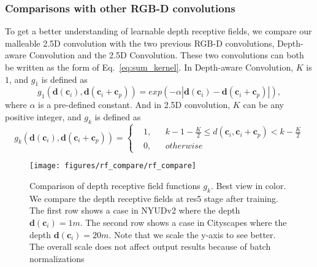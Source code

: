 \documentclass[runningheads]{llncs}
\begin{document}
\subsubsection{Comparisons with other RGB-D convolutions}
To get a better understanding of learnable depth receptive fields, we compare our malleable 2.5D convolution with the two previous RGB-D convolutions, Depth-aware Convolution and the 2.5D Convolution.
These two convolutions can both be written as the form of Eq.~\ref{eq:sum_kernel}.
In Depth-aware Convolution, $K$ is $1$, and $g_1$ is defined as
\begin{equation}
  g_1(\mathbf{d}(\mathbf{c}_i), \mathbf{d}(\mathbf{c}_i+\mathbf{c}_p))
  =
  exp(-\alpha|\mathbf{d}(\mathbf{c}_i)-\mathbf{d}(\mathbf{c}_i+\mathbf{c}_p)|),
\end{equation}
where $\alpha$ is a pre-defined constant.
And in 2.5D convolution, $K$ can be any positive integer, and $g_k$ is defined as
\begin{equation}
  g_k(\mathbf{d}(\mathbf{c}_i), \mathbf{d}(\mathbf{c}_i+\mathbf{c}_p))
  =
  \left\{
  \begin{aligned}
      &1, & & k-1-\frac{K}{2} \leq d(\mathbf{c}_i, \mathbf{c}_i+\mathbf{c}_p) < k-\frac{K}{2}\\
      &0, & & otherwise
    \end{aligned}
  \right.
\end{equation}

\begin{figure}[htbp]
  \centering
  \texttt{[image: figures/rf\_compare/rf\_compare]}
  \caption{
  Comparison of depth receptive field functions $g_k$.
  Best view in color.
  We compare the depth receptive fields at res5 stage after training.
  The first row shows a case in NYUDv2 where the depth $\mathbf{d}(\mathbf{c}_i)=1m$.
  The second row shows a case in Cityscapes where the depth $\mathbf{d}(\mathbf{c}_i)=20m$.
  Note that we scale the y-axis to see better.
  The overall scale does not affect output results because of batch normalizations
  }
  \label{fig:receptive_field_compare}
\end{figure}
\end{document}
